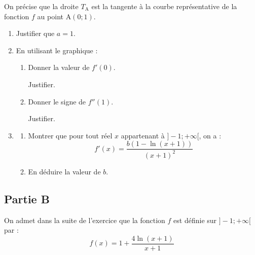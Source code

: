 	On précise que la droite $T_{\mathrm{A}}$ est la tangente à la courbe représentative de la fonction $f$ au point A$(0 ; 1)$.

	\begin{enumerate}
		\item Justifier que $a=1$.

		\item En utilisant le graphique :
		\begin{enumerate}
			\item Donner la valeur de $f'(0)$.

			Justifier.
			\item Donner le signe de $f''(1)$.

			Justifier.
		\end{enumerate}

		\item \begin{enumerate}
			\item Montrer que pour tout réel $x$ appartenant à $]-1 ;+\infty[$, on a :
			\[f'(x)=\dfrac{b(1-\ln (x+1))}{(x+1)^{2}}\]

			\item En déduire la valeur de $b$.
		\end{enumerate}
	\end{enumerate}


	\subsection*{Partie B}
	On admet dans la suite de l'exercice que la fonction $f$ est définie sur $]-1 ;+\infty[$ par :
	\[f(x)=1+\dfrac{4 \ln (x+1)}{x+1}\]

